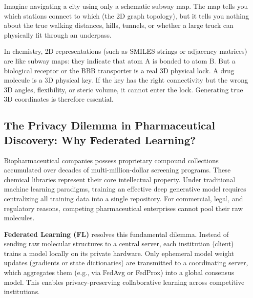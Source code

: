 \documentclass[12pt, a4paper]{article}
\begin{document}
\begin{intuition}
Imagine navigating a city using only a schematic subway map. The map tells you which stations connect to which (the 2D graph topology), but it tells you nothing about the true walking distances, hills, tunnels, or whether a large truck can physically fit through an underpass. 

In chemistry, 2D representations (such as SMILES strings or adjacency matrices) are like subway maps: they indicate that atom A is bonded to atom B. But a biological receptor or the BBB transporter is a real 3D physical lock. A drug molecule is a 3D physical key. If the key has the right connectivity but the wrong 3D angles, flexibility, or steric volume, it cannot enter the lock. Generating true 3D coordinates is therefore essential.
\end{intuition}

\subsection{The Privacy Dilemma in Pharmaceutical Discovery: Why Federated Learning?}
Biopharmaceutical companies possess proprietary compound collections accumulated over decades of multi-million-dollar screening programs. These chemical libraries represent their core intellectual property. Under traditional machine learning paradigms, training an effective deep generative model requires centralizing all training data into a single repository. For commercial, legal, and regulatory reasons, competing pharmaceutical enterprises cannot pool their raw molecules.

\textbf{Federated Learning (FL)} resolves this fundamental dilemma. Instead of sending raw molecular structures to a central server, each institution (client) trains a model locally on its private hardware. Only ephemeral model weight updates (gradients or state dictionaries) are transmitted to a coordinating server, which aggregates them (e.g., via FedAvg or FedProx) into a global consensus model. This enables privacy-preserving collaborative learning across competitive institutions.
\end{document}
